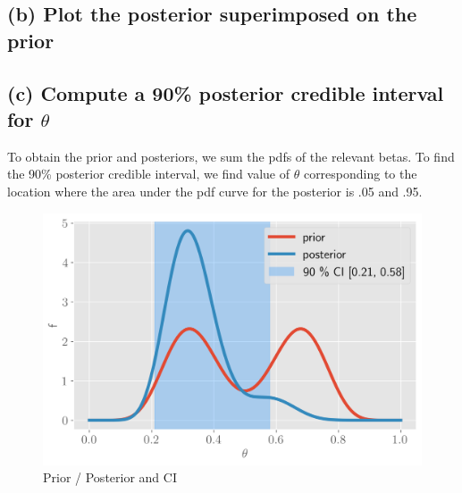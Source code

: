 \documentclass[11pt]{article}
\begin{document}
\subsection*{(b) Plot the posterior superimposed on the prior}
\subsection*{(c) Compute a 90\% posterior credible interval for $\theta$
}

To obtain the prior and posteriors, we sum the pdfs of the relevant betas. To find the 90\% posterior credible interval, we find value of $\theta$ corresponding to the location where the area under the pdf curve for the posterior is .05 and .95. 

\begin{figure}[!h]
    \centering
    \includegraphics[scale=.55]{homework_3/figures/binom.png}
    \caption{Prior / Posterior and CI}
    \label{fig:my_label}
\end{figure}
\end{document}
